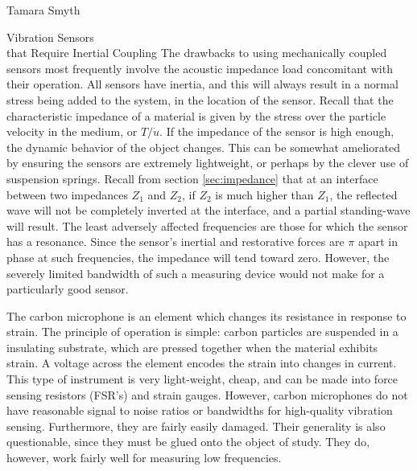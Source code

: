 \documentclass[a4paper,10pt]{report}
\numberwithin{equation}{section}
\begin{document}
\begin{chapter}{Tamara Smyth}
\begin{section}{Vibration Sensors \\that Require Inertial Coupling}
The drawbacks to using mechanically coupled sensors most frequently involve the acoustic impedance load concomitant with their operation. All sensors have inertia, and this will always result in a normal stress being added to the system, in the location of the sensor. Recall that the characteristic impedance of a material is given by the stress over the particle velocity in the medium, or $T/\dot{u}$. If the impedance of the sensor is high enough, the dynamic behavior of the object changes. This can be somewhat ameliorated by ensuring the sensors are extremely lightweight, or perhaps by the clever use of suspension springs. \cite[p.~4]{Cremer1973} Recall from section \ref{sec:impedance} that at an interface between two impedances $Z_1$ and $Z_2$, if $Z_2$ is much higher than $Z_1$, the reflected wave will not be completely inverted at the interface, and a partial standing-wave will result. The least adversely affected frequencies are those for which the sensor has a resonance. Since the sensor's inertial and 
restorative forces are $\pi$ apart in phase at such frequencies, the impedance will tend toward zero. However, the severely limited bandwidth of such a measuring device would not make for a particularly good sensor. \cite[p.~9]{Cremer1973} 

The carbon microphone is an element which changes its resistance in response to strain. The principle of operation is simple: carbon particles are suspended in a insulating substrate, which are pressed together when the material exhibits strain. A voltage across the element encodes the strain into changes in current. This type of instrument is very light-weight, cheap, and can be made into force sensing resistors (FSR's) and strain gauges. However, carbon microphones do not have reasonable signal to noise ratios or bandwidths for high-quality vibration sensing. Furthermore, they are fairly easily damaged. Their generality is also questionable, since they must be glued onto the object of study. They do, however, work fairly well for measuring low frequencies. \cite[p~.26]{Cremer1973}


\end{section}
\end{chapter}
\end{document}
